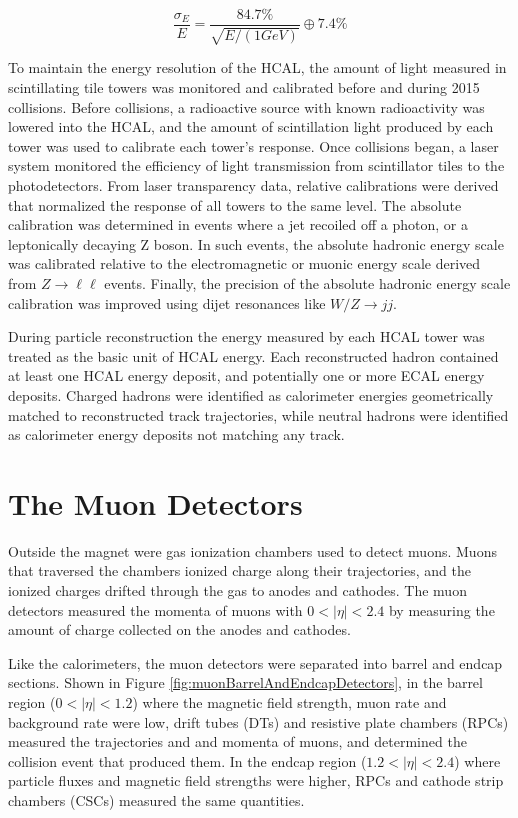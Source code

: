 \begin{equation}
	\frac{\sigma_{E}}{E} = \frac{84.7\%}{\sqrt{E/(1 GeV)}} \oplus 7.4\%
\end{equation}

To maintain the energy resolution of the HCAL, the amount of light measured in scintillating tile towers 
was monitored and calibrated before and during 2015 collisions.  Before collisions, a radioactive source 
with known radioactivity was lowered into the HCAL, and the amount of scintillation light produced by each 
tower was used to calibrate each tower's response.  Once collisions began, a laser system 
monitored the efficiency of light transmission from scintillator tiles to the photodetectors.  
From laser transparency data, relative calibrations were derived that normalized the response of all towers 
to the same level.  The absolute 
calibration was determined in events where a jet recoiled off a photon, or a leptonically decaying Z boson.  
In such events, the absolute hadronic energy 
scale was calibrated relative to the electromagnetic or muonic energy scale derived from $Z \rightarrow \ell\ell$ 
events.  Finally, the precision of the absolute hadronic energy scale calibration was improved using 
dijet resonances like $W/Z \rightarrow jj$.

During particle reconstruction the energy measured by each HCAL tower was treated as the basic unit of HCAL energy.  
Each reconstructed hadron contained at least one HCAL energy deposit, and potentially one or more ECAL energy 
deposits.  Charged hadrons were identified as calorimeter energies geometrically matched to reconstructed 
track trajectories, while neutral hadrons were identified as calorimeter energy deposits not matching any 
track.


\section{The Muon Detectors}
\label{sec:muonDetectorsDescription}
Outside the magnet were gas ionization chambers used to detect muons.  Muons that traversed the chambers 
ionized charge along their trajectories, and the ionized charges drifted through the gas to anodes and 
cathodes.  The muon detectors measured the momenta of muons with $0 < |\eta| < 2.4$ by measuring the amount of 
charge collected on the anodes and cathodes.

Like the calorimeters, the muon detectors were separated into barrel and endcap sections.  Shown in Figure \ref{fig:muonBarrelAndEndcapDetectors}, in the barrel 
region ($0 < |\eta| < 1.2$) where the magnetic field strength, muon rate and background rate were low, drift 
tubes (DTs) and resistive plate chambers (RPCs) measured the trajectories and 
and momenta of muons, and determined the collision event that produced them.  In the endcap 
region ($1.2 < |\eta| < 2.4$) where particle fluxes and magnetic field strengths were higher, RPCs and cathode 
strip chambers (CSCs) measured the same quantities.

